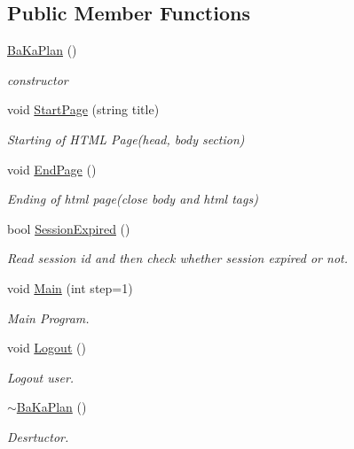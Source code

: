 \subsection*{Public Member Functions}
\begin{DoxyCompactItemize}
\item 
\hypertarget{classBaKaPlan_ab5d60f1b75c11a57f7998b709436dd03}{\hyperlink{classBaKaPlan_ab5d60f1b75c11a57f7998b709436dd03}{Ba\-Ka\-Plan} ()}\label{classBaKaPlan_ab5d60f1b75c11a57f7998b709436dd03}

\begin{DoxyCompactList}\small\item\em constructor \end{DoxyCompactList}\item 
void \hyperlink{classBaKaPlan_a8075b479df84a6cdb14362b3c9cff2ae}{Start\-Page} (string title)
\begin{DoxyCompactList}\small\item\em Starting of H\-T\-M\-L Page(head, body section) \end{DoxyCompactList}\item 
\hypertarget{classBaKaPlan_afc46e5f94732254151181cbbab23f9f2}{void \hyperlink{classBaKaPlan_afc46e5f94732254151181cbbab23f9f2}{End\-Page} ()}\label{classBaKaPlan_afc46e5f94732254151181cbbab23f9f2}

\begin{DoxyCompactList}\small\item\em Ending of html page(close body and html tags) \end{DoxyCompactList}\item 
bool \hyperlink{classBaKaPlan_ad10bc1730e8ba4203c4dfe03dc9a1b8c}{Session\-Expired} ()
\begin{DoxyCompactList}\small\item\em Read session id and then check whether session expired or not. \end{DoxyCompactList}\item 
void \hyperlink{classBaKaPlan_a178180219c76a27ba2f962aeca65dfbe}{Main} (int step=1)
\begin{DoxyCompactList}\small\item\em Main Program. \end{DoxyCompactList}\item 
\hypertarget{classBaKaPlan_aebb2837fc53024969f1d8f3c47b1b11b}{void \hyperlink{classBaKaPlan_aebb2837fc53024969f1d8f3c47b1b11b}{Logout} ()}\label{classBaKaPlan_aebb2837fc53024969f1d8f3c47b1b11b}

\begin{DoxyCompactList}\small\item\em Logout user. \end{DoxyCompactList}\item 
\hyperlink{classBaKaPlan_aa68c1ddc933bfce4856982527467f679}{$\sim$\-Ba\-Ka\-Plan} ()
\begin{DoxyCompactList}\small\item\em Desrtuctor. \end{DoxyCompactList}\end{DoxyCompactItemize}
